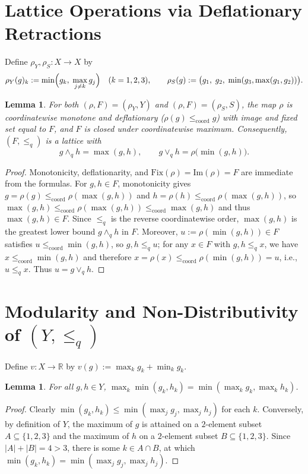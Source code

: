 \documentclass[11pt]{article}
\newtheorem{lemma}[theorem]{Lemma}
\begin{document}
\section{Lattice Operations via Deflationary Retractions}

Define $\rho_Y, \rho_S : X \to X$ by
\[
\rho_Y(g)_k := \min\Bigl(g_k,\; \max_{j \neq k} g_j\Bigr) \quad (k = 1, 2, 3),
\qquad
\rho_S(g) := \bigl(g_1,\; g_2,\; \min(g_3, \max(g_1, g_2))\bigr).
\]

\begin{lemma}\label{lem:retract}
For both $(\rho, F) = (\rho_Y, Y)$ and $(\rho, F) = (\rho_S, S)$, the map $\rho$
is coordinatewise monotone and deflationary ($\rho(g) \le_{\mathrm{coord}} g$)
with image and fixed set equal to $F$, and $F$ is closed under coordinatewise
maximum. Consequently, $(F, \le_q)$ is a lattice with
\[
g \wedge_q h = \max(g, h),
\qquad
g \vee_q h = \rho\bigl(\min(g, h)\bigr).
\]
\end{lemma}

\begin{proof}
Monotonicity, deflationarity, and $\mathrm{Fix}(\rho) = \mathrm{Im}(\rho) = F$
are immediate from the formulas. For $g, h \in F$, monotonicity gives
$g = \rho(g) \le_{\mathrm{coord}} \rho(\max(g, h))$ and
$h = \rho(h) \le_{\mathrm{coord}} \rho(\max(g, h))$, so
$\max(g, h) \le_{\mathrm{coord}} \rho(\max(g, h)) \le_{\mathrm{coord}} \max(g, h)$
and thus $\max(g, h) \in F$. Since $\le_q$ is the reverse coordinatewise order,
$\max(g, h)$ is the greatest lower bound $g \wedge_q h$ in $F$. Moreover,
$u := \rho(\min(g, h)) \in F$ satisfies $u \le_{\mathrm{coord}} \min(g, h)$, so
$g, h \le_q u$; for any $x \in F$ with $g, h \le_q x$, we have
$x \le_{\mathrm{coord}} \min(g, h)$ and therefore
$x = \rho(x) \le_{\mathrm{coord}} \rho(\min(g, h)) = u$, i.e., $u \le_q x$.
Thus $u = g \vee_q h$.
\end{proof}

\section{Modularity and Non-Distributivity of $(Y, \le_q)$}

Define $v : X \to \mathbb{R}$ by $v(g) := \max_k g_k + \min_k g_k$.

\begin{lemma}\label{lem:overlap}
For all $g, h \in Y$,
$\max_k \min(g_k, h_k) = \min(\max_k g_k, \max_k h_k)$.
\end{lemma}

\begin{proof}
Clearly $\min(g_k, h_k) \le \min(\max_j g_j, \max_j h_j)$ for each $k$.
Conversely, by definition of $Y$, the maximum of $g$ is attained on a
$2$-element subset $A \subseteq \{1, 2, 3\}$ and the maximum of $h$ on a
$2$-element subset $B \subseteq \{1, 2, 3\}$. Since $|A| + |B| = 4 > 3$, there
is some $k \in A \cap B$, at which
$\min(g_k, h_k) = \min(\max_j g_j, \max_j h_j)$.
\end{proof}
\end{document}
